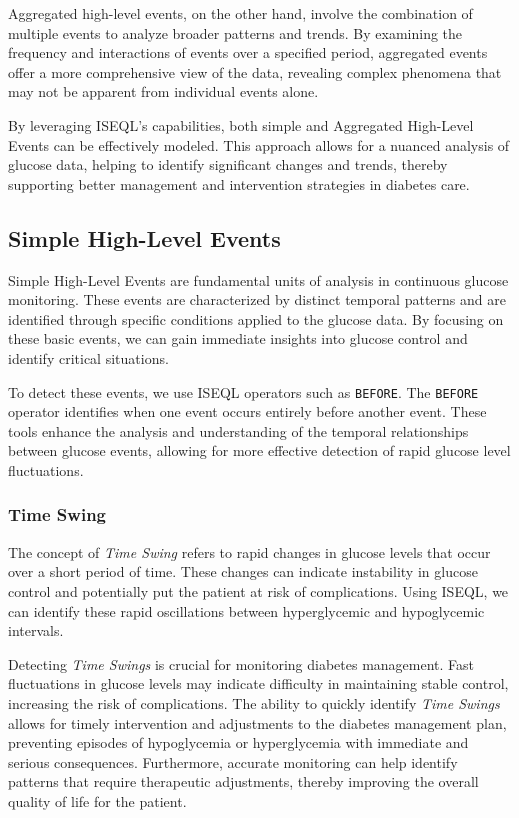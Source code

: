 \documentclass{article}
\begin{document}
Aggregated high-level events, on the other hand, involve the combination of multiple events to analyze broader patterns and trends. By examining the frequency and interactions of events over a specified period, aggregated events offer a more comprehensive view of the data, revealing complex phenomena that may not be apparent from individual events alone.

By leveraging ISEQL's capabilities, both simple and Aggregated High-Level Events can be effectively modeled. This approach allows for a nuanced analysis of glucose data, helping to identify significant changes and trends, thereby supporting better management and intervention strategies in diabetes care.

\subsection{Simple High-Level Events}

Simple High-Level Events are fundamental units of analysis in continuous glucose monitoring. These events are characterized by distinct temporal patterns and are identified through specific conditions applied to the glucose data. By focusing on these basic events, we can gain immediate insights into glucose control and identify critical situations.

To detect these events, we use ISEQL operators such as \texttt{BEFORE}. The \texttt{BEFORE} operator identifies when one event occurs entirely before another event. These tools enhance the analysis and understanding of the temporal relationships between glucose events, allowing for more effective detection of rapid glucose level fluctuations.

\subsubsection{Time Swing}
The concept of \textit{Time Swing} refers to rapid changes in glucose levels that occur over a short period of time. These changes can indicate instability in glucose control and potentially put the patient at risk of complications. Using ISEQL, we can identify these rapid oscillations between hyperglycemic and hypoglycemic intervals.

Detecting \textit{Time Swings} is crucial for monitoring diabetes management. Fast fluctuations in glucose levels may indicate difficulty in maintaining stable control, increasing the risk of complications. The ability to quickly identify \textit{Time Swings} allows for timely intervention and adjustments to the diabetes management plan, preventing episodes of hypoglycemia or hyperglycemia with immediate and serious consequences. Furthermore, accurate monitoring can help identify patterns that require therapeutic adjustments, thereby improving the overall quality of life for the patient.
\end{document}
